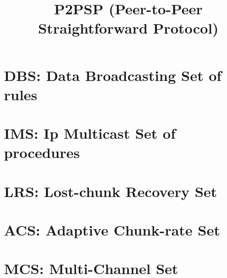 \title{P2PSP (Peer-to-Peer Straightforward Protocol)}
\maketitle
\tableofcontents

\begin{abstract}

\end{abstract}

\section{DBS: Data Broadcasting Set of rules}
\label{sec:DBL}


\section{IMS: Ip Multicast Set of procedures}
\label{sec:IMS}


\section{LRS: Lost-chunk Recovery Set}
\label{sec:LRS}


\section{ACS: Adaptive Chunk-rate Set}
\label{sec:ACS}


\section{MCS: Multi-Channel Set}
\label{sec:MCS}



